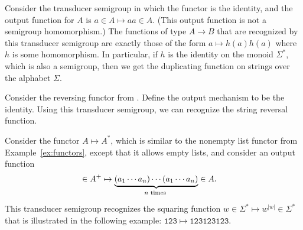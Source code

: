 \begin{example}\label{ex:duplicator}
    Consider the transducer semigroup in which the functor is the identity, and the output function for $A$ is  $a \in A \mapsto aa \in A$. (This output function is not a semigroup homomorphism.)
    The functions of type $A \to B$ that are recognized by this transducer semigroup are exactly those of the form $a \mapsto h(a)h(a)$ where $h$ is some homomorphism. In particular, if $h$ is the identity on the monoid $\Sigma^*$, which is also a semigroup, then we get the duplicating function on strings over the alphabet $\Sigma$.
\end{example}



\begin{example}
    Consider the reversing functor from . Define the output mechanism to be the identity. Using this transducer semigroup, we can recognize the string reversal  function.
\end{example}

\begin{example}\label{ex:squaring}
    Consider the functor $A \mapsto A^*$, which is similar to the nonempty list functor from Example~\ref{ex:functors}, except that it allows empty lists, and consider an output function 
    \begin{align*}
    [a_1,\ldots,a_n] \in A^+ & \mapsto \myunderbrace{(a_1 \cdots a_n) \cdots (a_1 \cdots a_n)}{$n$ times} \in A.
    \end{align*}
    This transducer semigroup recognizes the squaring function $w \in \Sigma^* \mapsto w^{|w|} \in \Sigma^*$  that is illustrated in the following example: $\mathtt{123 \mapsto 123123123}$.
\end{example}

    
    
